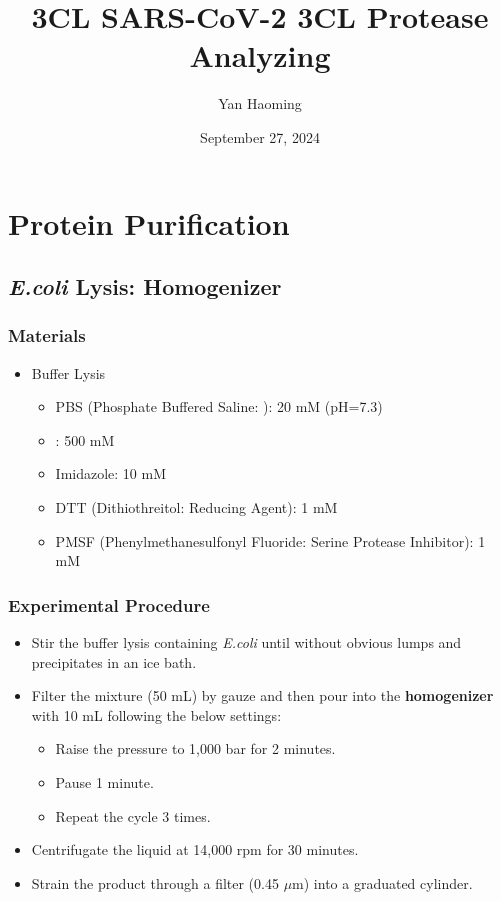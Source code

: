 \documentclass{report}
\title{3CL SARS-CoV-2 3CL Protease Analyzing}
\author{Yan Haoming}
\date{September 27, 2024}
\begin{document}
\maketitle
\chapter{Protein Purification}
\section{\textit{E.coli} Lysis: Homogenizer}
\subsection{Materials}
\begin{itemize}
    \item Buffer Lysis
    \begin{itemize}
        \item PBS (Phosphate Buffered Saline: ): 20 mM (pH=7.3)
        \item {}: 500 mM
        \item Imidazole: 10 mM
        \item DTT (Dithiothreitol: Reducing Agent): 1 mM
        \item PMSF (Phenylmethanesulfonyl Fluoride: Serine Protease Inhibitor): 1 mM
    \end{itemize}
\end{itemize}
\subsection{Experimental Procedure}
\begin{itemize}
    \item Stir the buffer lysis containing \textit{E.coli} until without obvious lumps and precipitates in an ice bath.
    \item Filter the mixture (50 mL) by gauze and then pour into the \textbf{homogenizer}\cite{Homogenization} with 10 mL  following the below settings:
    \begin{itemize}
        \item Raise the pressure to 1,000 bar for 2 minutes.
        \item Pause 1 minute.
        \item Repeat the cycle 3 times.
    \end{itemize}
    \item Centrifugate the liquid at 14,000 rpm for 30 minutes.
    \item Strain the product through a filter (0.45 $\mu$m) into a graduated cylinder.
\end{itemize}
\end{document}
